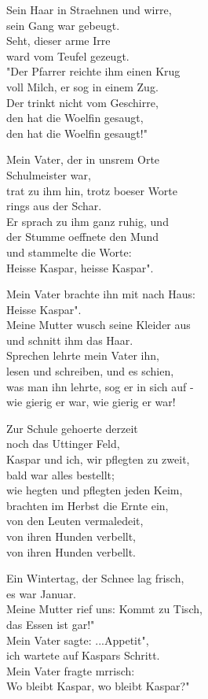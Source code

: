 \documentclass[
  letterpaper,
]{scrbook}
\begin{document}
Sein Haar in Straehnen und wirre,\\
sein Gang war gebeugt.\\
Seht, dieser arme Irre\\
ward vom Teufel gezeugt.\\
"Der Pfarrer reichte ihm einen Krug\\
voll Milch, er sog in einem Zug.\\
Der trinkt nicht vom Geschirre,\\
den hat die Woelfin gesaugt,\\
den hat die Woelfin gesaugt!"

Mein Vater, der in uns\textquotesingle rem Orte\\
Schulmeister war,\\
trat zu ihm hin, trotz boeser Worte\\
rings aus der Schar.\\
Er sprach zu ihm ganz ruhig, und\\
der Stumme oeffnete den Mund\\
und stammelte die Worte:\\
Heisse Kaspar, heisse Kaspar".

Mein Vater brachte ihn mit nach Haus:\\
Heisse Kaspar".\\
Meine Mutter wusch seine Kleider aus\\
und schnitt ihm das Haar.\\
Sprechen lehrte mein Vater ihn,\\
lesen und schreiben, und es schien,\\
was man ihn lehrte, sog er in sich auf -\\
wie gierig er war, wie gierig er war!

Zur Schule gehoerte derzeit\\
noch das Uttinger Feld,\\
Kaspar und ich, wir pflegten zu zweit,\\
bald war alles bestellt;\\
wie hegten und pflegten jeden Keim,\\
brachten im Herbst die Ernte ein,\\
von den Leuten vermaledeit,\\
von ihren Hunden verbellt,\\
von ihren Hunden verbellt.

Ein Wintertag, der Schnee lag frisch,\\
es war Januar.\\
Meine Mutter rief uns: Kommt zu Tisch,\\
das Essen ist gar!"\\
Mein Vater sagte: ...Appetit",\\
ich wartete auf Kaspars Schritt.\\
Mein Vater fragte mrrisch:\\
Wo bleibt Kaspar, wo bleibt Kaspar?"
\end{document}
